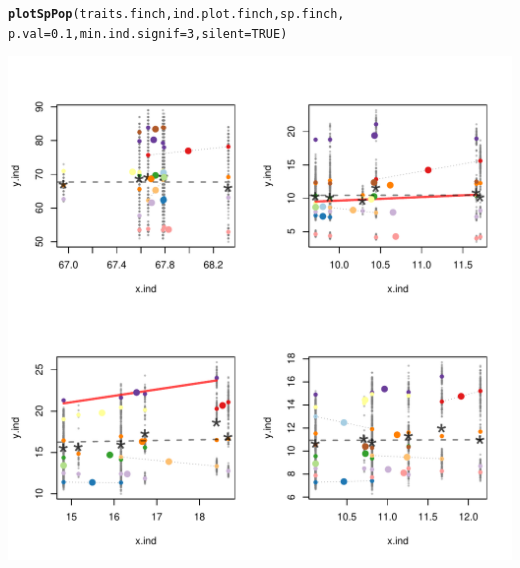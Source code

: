 \documentclass[12pt]{article}\usepackage[]{graphicx}\usepackage[]{color}
\makeatletter
\def\maxwidth{ %
  \ifdim\Gin@nat@width>\linewidth
    \linewidth
  \else
    \Gin@nat@width
  \fi
}
\newcommand{\hlnum}[1]{\textcolor[rgb]{0.686,0.059,0.569}{#1}}%
\newcommand{\hlstd}[1]{\textcolor[rgb]{0.345,0.345,0.345}{#1}}%
\newcommand{\hlkwc}[1]{\textcolor[rgb]{0.333,0.667,0.333}{#1}}%
\newcommand{\hlkwd}[1]{\textcolor[rgb]{0.737,0.353,0.396}{\textbf{#1}}}%
\newenvironment{kframe}{%
 \def\at@end@of@kframe{}%
 \ifinner\ifhmode%
  \def\at@end@of@kframe{\end{minipage}}%
  \begin{minipage}{\columnwidth}%
 \fi\fi%
 \def\FrameCommand##1{\hskip\@totalleftmargin \hskip-\fboxsep
 \colorbox{shadecolor}{##1}\hskip-\fboxsep
     \hskip-\linewidth \hskip-\@totalleftmargin \hskip\columnwidth}%
 \MakeFramed {\advance\hsize-\width
   \@totalleftmargin\z@ \linewidth\hsize
   \@setminipage}}%
 {\par\unskip\endMakeFramed%
 \at@end@of@kframe}
\newenvironment{knitrout}{}{} %
\makeatother
\begin{document}
\begin{knitrout}
\color{fgcolor}\begin{kframe}
\begin{alltt}
\hlkwd{plotSpPop}\hlstd{(traits.finch, ind.plot.finch, sp.finch,}
      \hlkwc{p.val} \hlstd{=} \hlnum{0.1}\hlstd{,} \hlkwc{min.ind.signif} \hlstd{=} \hlnum{3}\hlstd{,} \hlkwc{silent} \hlstd{=} \hlnum{TRUE}\hlstd{)}
\end{alltt}
\end{kframe}
\includegraphics[width=\maxwidth]{figure/unnamed-chunk-28} 

\end{knitrout}

\newpage
\end{document}
